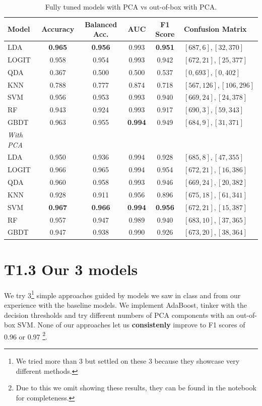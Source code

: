 \documentclass{article}
\begin{document}
\begin{table}[h]
    \centering
    \begin{tabular}{lSSSSl}
        \toprule
        {Model} & {Accuracy} & {Balanced Acc.} & {AUC} & {F1 Score} & {Confusion Matrix} \\
        \midrule
        LDA & \textbf{0.965} & \textbf{0.956} & 0.993 & \textbf{0.951} & \([687, 6], [32, 370]\) \\
        LOGIT & 0.958 & 0.954 & 0.993 & 0.942 & \([672, 21], [25, 377]\) \\
        QDA & 0.367 & 0.500 & 0.500 & 0.537 & \([0, 693], [0, 402]\) \\
        KNN & 0.788 & 0.777 & 0.874 & 0.718 & \([567, 126], [106, 296]\) \\
        SVM & 0.956 & 0.953 & 0.993 & 0.940 & \([669, 24], [24, 378]\) \\
        RF & 0.943 & 0.924 & 0.993 & 0.917 & \([690, 3], [59, 343]\) \\
        GBDT & 0.963 & 0.955 & \textbf{0.994} & 0.949 & \([684, 9], [31, 371]\) \\ \midrule
        \textit{With PCA} \\\midrule
        LDA & 0.950 & 0.936 & 0.994 & 0.928 & \([685, 8], [47, 355]\) \\
        LOGIT & 0.966 & 0.965 & 0.994 & 0.954 & \([672, 21], [16, 386]\) \\
        QDA & 0.960 & 0.958 & 0.993 & 0.946 & \([669, 24], [20, 382]\) \\
        KNN & 0.928 & 0.911 & 0.956 & 0.896 & \([675, 18], [61, 341]\) \\
        SVM & \textbf{0.967} & \textbf{0.966} & \textbf{0.994} & \textbf{0.956} & \([672, 21], [15, 387]\) \\
        RF & 0.957 & 0.947 & 0.989 & 0.940 & \([683, 10], [37, 365]\) \\
        GBDT & 0.947 & 0.938 & 0.990 & 0.926 & \([673, 20], [38, 364]\) \\
        \bottomrule
    \end{tabular}
    \caption{Fully tuned models with PCA vs out-of-box with PCA.}
    \label{tab:metrics}
\end{table}



\section*{T1.3 Our 3 models} \label{sec:1.3}
We try 3\footnote{We tried more than 3 but settled on these 3 because they showcase very different methods.} simple approaches guided by models
we saw in class and from our experience with the baseline models. We implement AdaBoost, tinker with the decision thresholds and try different numbers of PCA components with an out-of-box SVM. None of our approaches let us \textbf{consistenly} improve to F1 scores of 0.96 or 0.97
\footnote{Due to this we omit showing these results, they can be found in the notebook for completeness.}. 
\end{document}
